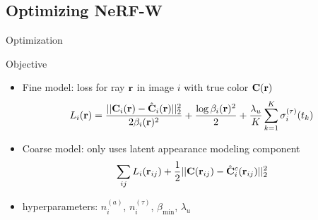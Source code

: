 \documentclass[aspectratio=1610]{beamer}
\begin{document}
\subsection{Optimizing NeRF-W}
\begin{frame}{Optimization}
    \begin{block}{Objective}
        \begin{itemize}
            \item Fine model: loss for ray \(\vb{r}\) in image \(i\) with true color \(\vb{C}(\vb{r})\)
            \begin{equation*}
                L_i(\vb{r}) 
                = \frac{|| \vb{C}_i (\vb{r}) - \hat{\vb{C}}_i (\vb{r}) ||_2^2}{2\beta_i (\vb{r})^2} 
                + \frac{\log \beta_i (\vb{r})^2}{2} 
                + \frac{\lambda_u}{K} \sum^K_{k=1}\sigma_i^{(\tau)} (t_k)
            \end{equation*}
            \item Coarse model: only uses latent appearance modeling component
            \begin{equation*}
                \sum_{ij} L_i (\vb{r}_{ij}) + \frac{1}{2} || \vb{C} (\vb{r}_{ij}) - \hat{\vb{C}}_i^c (\vb{r}_{ij}) ||^2_2 
            \end{equation*}
            \item hyperparameters: \(n_i^{(a)}\), \(n_i^{(\tau)}\), \(\beta_{\textrm{min}}\), \(\lambda_u\)
        \end{itemize}
    \end{block}  
\end{frame}
\end{document}
